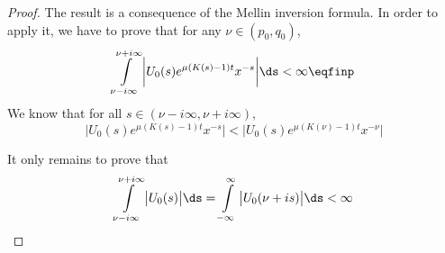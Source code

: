     \begin{proof}
    The result is a consequence of the Mellin inversion formula.
    In order to apply it, we have to prove that for any $\nu \in (p_0, q_0)$, 
        \begin{equation*}
            \int\limits_{\nu - i \infty}^{\nu + i \infty} \bigg| U_0(s) e^{\mu(K(s) - 1) t} x^{-s} \bigg| \ds < \infty
            \eqfinp
        \end{equation*}
    We know that for all $s \in (\nu - i\infty, \nu + i\infty)$, 
        \begin{equation*}
             \bigg| U_0(s) e^{\mu(K(s) - 1) t} x^{-s} \bigg|  <   \bigg| U_0(s)  e^{\mu(K(\nu) - 1) t}  x^{-\nu} \bigg|
        \end{equation*}
    
    It only remains to prove that 
        \begin{equation}
                \int\limits_{\nu - i \infty}^{\nu + i \infty} \big| U_0(s)\big| \ds 
                = 
                \int\limits_{-\infty}^{\infty} \big| U_0(\nu + is)\big| \ds
                < \infty
                \label{eq:DouEsc43}
        \end{equation}
    

\end{proof}
